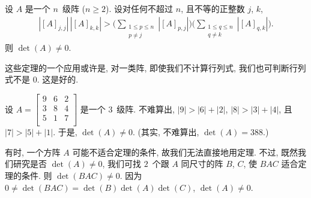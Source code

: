 \documentclass[../libro.tex]{subfiles}
\begin{document}
\begin{theorem}
    设 \(A\) 是一个 \(n\)~级阵 (\(n \geq 2\)).
    设对任何不超过 \(n\), 且不等的正整数 \(j\), \(k\),
    \begin{align*}
        |[A]_{j,j}|\,|[A]_{k,k}| >
        \Bigg(
            \sum_{\substack{1 \leq p \leq n \\
            p \neq j}} {|[A]_{p,j}|}
        \Bigg)
        \Bigg(
            \sum_{\substack{1 \leq q \leq n \\
            q \neq k}} {|[A]_{q,k}|}
        \Bigg).
    \end{align*}
    则 \(\det {(A)} \neq 0\).
\end{theorem}

这些定理的一个应用或许是,
对一类阵,
即使我们不计算行列式,
我们也可判断行列式不是 \(0\).
这是好的.

\begin{example}\label{emp:NonzeroDet1}
    设 \(A =
        \begin{bmatrix}
            9 & 6 & 2 \\
            3 & 8 & 4 \\
            5 & 1 & 7 \\
    \end{bmatrix}\)
    是一个 \(3\)~级阵.
    不难算出, \(|9| > |6| + |2|\),
    \(|8| > |3| + |4|\),
    且 \(|7| > |5| + |1|\).
    于是, \(\det {(A)} \neq 0\).
    (其实, 不难算出, \(\det {(A)} = 388.\))
\end{example}

有时, 一个方阵 \(A\) 可能不适合定理的条件, 故我们无法直接地用定理.
不过, 既然我们研究是否 \(\det {(A)} \neq 0\),
我们可找 \(2\)~个跟 \(A\) 同尺寸的阵 \(B\), \(C\),
使 \(BAC\) 适合定理的条件.
则 \(\det {(BAC)} \neq 0\).
因为 \(0 \neq \det {(BAC)} = \det {(B)} \det {(A)} \det {(C)}\),
\(\det {(A)} \neq 0\).
\end{document}
